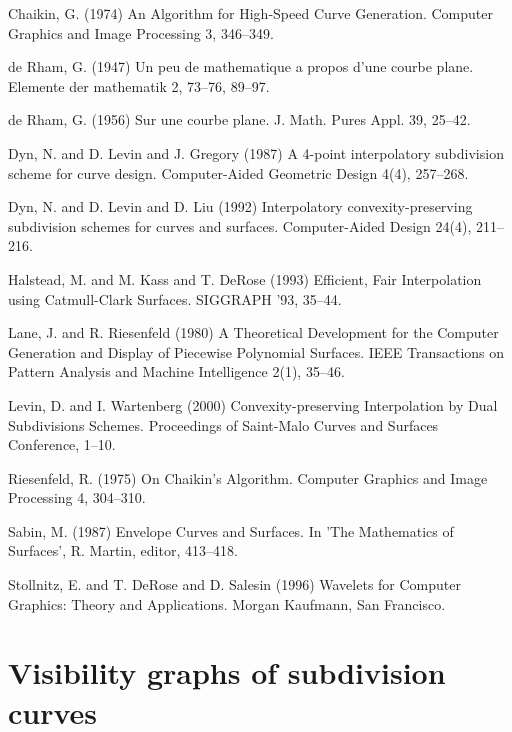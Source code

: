 \documentclass[12pt]{article}
\begin{document}

\begin{thebibliography}{Lozano-Perez 83}

Chaikin, G. (1974)
An Algorithm for High-Speed Curve Generation.
Computer Graphics and Image Processing 3, 346--349.

de Rham, G. (1947)
Un peu de mathematique a propos d'une courbe plane.
Elemente der mathematik 2, 73--76, 89--97.

de Rham, G. (1956)
Sur une courbe plane.
J. Math. Pures Appl. 39, 25--42.

Dyn, N. and D. Levin and J. Gregory (1987)
A 4-point interpolatory subdivision scheme for curve design.
Computer-Aided Geometric Design 4(4), 257--268.

Dyn, N. and D. Levin and D. Liu (1992)
Interpolatory convexity-preserving subdivision schemes for curves and surfaces.
Computer-Aided Design 24(4), 211--216.

Halstead, M. and M. Kass and T. DeRose (1993)
Efficient, Fair Interpolation using Catmull-Clark Surfaces.
SIGGRAPH '93, 35--44.

Lane, J. and R. Riesenfeld (1980)
A Theoretical Development for the Computer Generation and Display of
Piecewise Polynomial Surfaces.
IEEE Transactions on Pattern Analysis and Machine Intelligence 2(1), 35--46.

Levin, D. and I. Wartenberg (2000)
Convexity-preserving Interpolation by Dual Subdivisions Schemes.
Proceedings of Saint-Malo Curves and Surfaces Conference, 1--10.

Riesenfeld, R. (1975)
On Chaikin's Algorithm.
Computer Graphics and Image Processing 4, 304--310.

Sabin, M. (1987)
Envelope Curves and Surfaces.
In 'The Mathematics of Surfaces', R. Martin, editor, 413--418.

Stollnitz, E. and T. DeRose and D. Salesin (1996)
Wavelets for Computer Graphics: Theory and Applications.
Morgan Kaufmann, San Francisco.

\end{thebibliography}

\section{Visibility graphs of subdivision curves}
\end{document}
